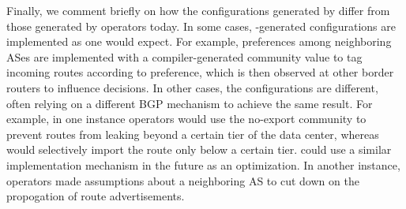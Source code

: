 Finally, we comment briefly on how the configurations generated by \sysname differ from those generated by operators today. In some cases, \sysname-generated configurations are implemented as one would expect. For example, preferences among neighboring ASes are implemented with a compiler-generated community value to tag incoming routes according to preference, which is then observed at other border routers to influence decisions. In other cases, the \sysname configurations are different, often relying on a different BGP mechanism to achieve the same result. For example, in one instance operators would use the no-export community to prevent routes from leaking beyond a certain tier of the data center, whereas \sysname would selectively import the route only below a certain tier. \sysname could use a similar implementation mechanism in the future as an optimization. In another instance, operators made assumptions about a neighboring AS to cut down on the propogation of route advertisements.



